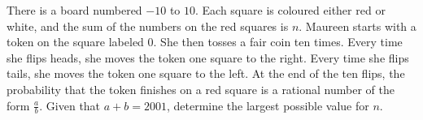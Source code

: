 There is a board numbered $-10$ to $10$. Each square is coloured either red or white, and the sum of the numbers on the red squares is $n$. Maureen starts with a token on the square labeled $0$. She then tosses a fair coin ten times. Every time she flips heads, she moves the token one square to the right. Every time she flips tails, she moves the token one square to the left.  At the end of the ten flips, the probability that the token finishes on a red square is a rational number of the form $\frac a b$. Given that $a + b = 2001$, determine the largest possible value for $n$.
